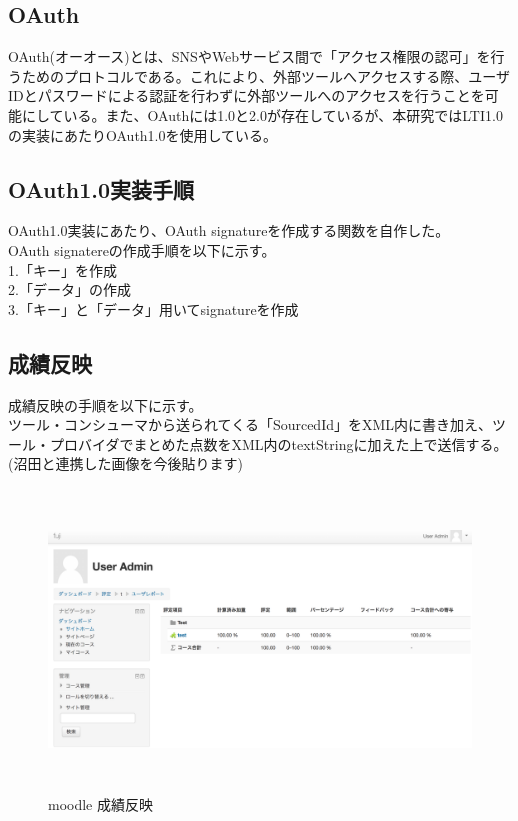 \subsection{OAuth}
OAuth(オーオース)とは、SNSやWebサービス間で「アクセス権限の認可」を行うためのプロトコルである。これにより、外部ツールへアクセスする際、ユーザIDとパスワードによる認証を行わずに外部ツールへのアクセスを行うことを可能にしている。また、OAuthには1.0と2.0が存在しているが、本研究ではLTI1.0の実装にあたりOAuth1.0を使用している。
\subsection{OAuth1.0実装手順}
OAuth1.0実装にあたり、OAuth signatureを作成する関数を自作した。\\
OAuth signatereの作成手順を以下に示す。\\
1.「キー」を作成\\
2.「データ」の作成\\
3.「キー」と「データ」用いてsignatureを作成\\
\subsection{成績反映}
成績反映の手順を以下に示す。\\
ツール・コンシューマから送られてくる「SourcedId」をXML内に書き加え、ツール・プロバイダでまとめた点数をXML内のtextStringに加えた上で送信する。(沼田と連携した画像を今後貼ります)\\
\begin{figure}[htbp]
  \begin{center}
    \includegraphics[clip,width=12.0cm,height=8.0cm]{img/score.png}
    \caption{moodle 成績反映}
    \label{fig:moodle score}
  \end{center}
\end{figure}
